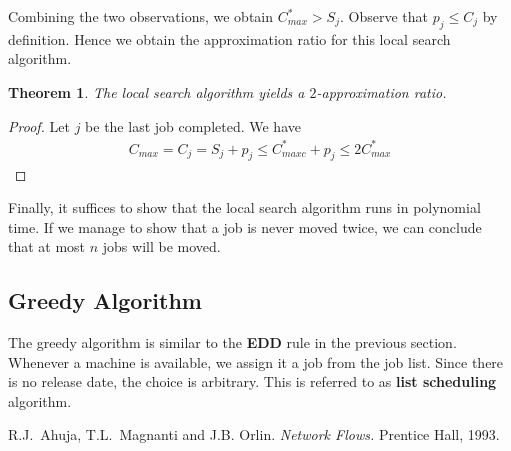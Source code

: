\documentclass[11pt,psfig,times]{article}
\newtheorem{theorem}{Theorem}
\begin{document}
Combining the two observations, we obtain $C_{max}^* > S_j$. Observe that $p_j \leq C_j$ by definition. 
Hence we obtain the approximation ratio for this local search algorithm.
\begin{theorem}
    The local search algorithm yields a $2$-approximation ratio.
\end{theorem}
\begin{proof}
    Let $j$ be the last job completed. We have
    \begin{align*}
        C_{max} = C_j = S_j + p_j \leq C_{maxc}^* + p_j \leq 2C_{max}^*
    \end{align*}
\end{proof}
Finally, it suffices to show that the local search algorithm runs in polynomial time. If we manage 
to show that a job is never moved twice, we can conclude that at most $n$ jobs will be moved. 



\subsection{Greedy Algorithm}
The greedy algorithm is similar to the \textbf{EDD} rule in the previous section. Whenever a machine is available, 
we assign it a job from the job list. Since there is no release date, the choice is arbitrary. 
This is referred to as \textbf{list scheduling} algorithm.  



\begin{thebibliography}{10}
\setlength{\itemsep}{0pt plus .3pt}
\setlength{\parsep}{0pt plus .3pt}
\setlength{\parskip}{0pt plus .3pt}

R.J.\ Ahuja, T.L.\ Magnanti and J.B. Orlin. {\em Network Flows.\/} Prentice Hall, 1993.

\end{thebibliography}
\end{document}
